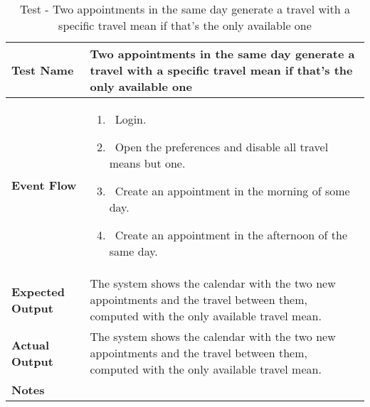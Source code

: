 \begin{table}[h]	
\centering
\def\arraystretch{1.5}
\begin{tabular}{|m{7cm}|m{7cm}|}
	\hline
	\textbf{Test Name}            &  Two appointments in the same day generate a travel with a specific travel mean if that's the only available one  \\ \hline
	\textbf{Event Flow}             &   
		\begin{enumerate}
			\item~Login.
			\item~Open the preferences and disable all travel means but one.
			\item~Create an appointment in the morning of some day.
			\item~Create an appointment in the afternoon of the same day.
		\end{enumerate}
	\\ \hline
	\textbf{Expected Output}  &   The system shows the calendar with the two new appointments and the travel between them, computed with the only available travel mean.  \\ \hline
	\textbf{Actual Output}       &  The system shows the calendar with the two new appointments and the travel between them, computed with the only available travel mean.   \\ \hline
	\textbf{Notes} & \\ \hline
\end{tabular}
\caption{Test - Two appointments in the same day generate a travel with a specific travel mean if that's the only available one}
\end{table}